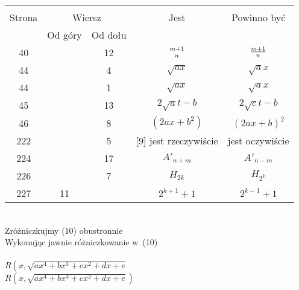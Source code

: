 \documentclass[a4paper,11pt]{article}
\begin{document}
\begin{center}
  \begin{tabular}{|c|c|c|c|c|}
    \hline
    & \multicolumn{2}{c|}{} & & \\
    Strona & \multicolumn{2}{c|}{Wiersz} & Jest
                              & Powinno być \\ \cline{2-3}
    & Od góry & Od dołu & & \\
    \hline
    40  & & 12 & ${ m + 1 \atop n }$ & $\frac{ m + 1 }{ n }$ \\
    44  & &  4 & $\sqrt{ a x }$ & $\sqrt{ a } x$ \\
    44  & &  1 & $\sqrt{ a x }$ & $\sqrt{ a } x$ \\
    45  & & 13 & $2 \sqrt{ a } t - b$ & $2 \sqrt{ c } t - b$ \\
    46  & &  8 & $( 2 a x + b^{ 2 } )$ & $( 2 a x + b )^{ 2 }$ \\
    222 & &  5 & [9] jest rzeczywiście & jest oczywiście \\
    224 & & 17 & $A'_{ n + m }$ & $A'_{ n - m }$ \\
    226 & &  7 & $H_{ 2k }$ & $H_{ 2^{ k } }$ \\
    227 & 11 & & $2^{ k + 1 } + 1$ & $2^{ k - 1 } + 1$ \\
    \hline
  \end{tabular}
\end{center}
\noi
{} \\
\Jest Zróżniczkujmy (10) obustronnie \\
\Pow  Wykonując jawnie różniczkowanie w~(10) \\
 \\
\Jest $R\left( x, \sqrt{ a x^{ 4 } + b x^{ 3 } + c x^{ 2 } + d x + e }
\right.$ \\
\Pow $R\left( x, \sqrt{ a x^{ 4 } + b x^{ 3 } + c x^{ 2 } + d x + e }
\right)$ \\
\end{document}
